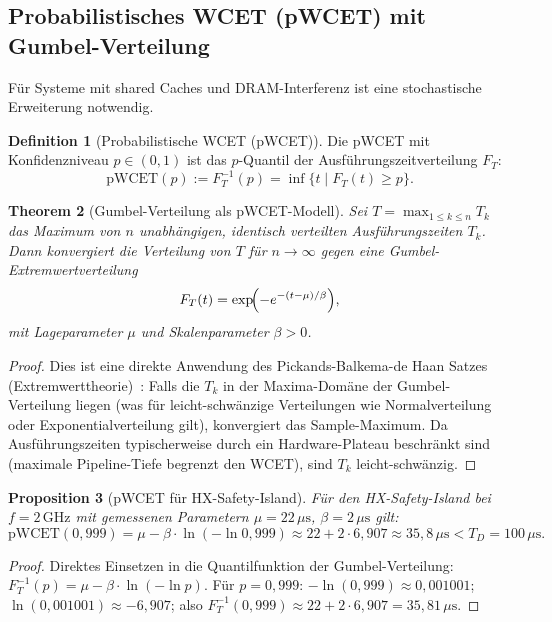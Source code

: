 ﻿\documentclass[a4paper,12pt]{article}
\theoremstyle{plain}
\newtheorem{theorem}{Theorem}[section]
\newtheorem{proposition}[theorem]{Proposition}
\theoremstyle{definition}
\newtheorem{definition}[theorem]{Definition}
\theoremstyle{remark}
\begin{document}
\subsection{Probabilistisches WCET (pWCET) mit Gumbel-Verteilung}
\label{ssec:pwcet}

Für Systeme mit shared Caches und DRAM-Interferenz ist eine
stochastische Erweiterung notwendig.

\begin{definition}[Probabilistische WCET (pWCET)]\label{def:pwcet}
Die pWCET mit Konfidenzniveau $p \in (0,1)$ ist das $p$-Quantil
der Ausführungszeitverteilung $F_T$:
\[
  \mathrm{pWCET}(p) := F_T^{-1}(p) = \inf\{t \mid F_T(t) \geq p\}.
\]
\end{definition}

\begin{theorem}[Gumbel-Verteilung als pWCET-Modell]\label{thm:gumbel}
Sei $T = \max_{1 \leq k \leq n} T_k$ das Maximum von $n$ unabhängigen,
identisch verteilten Ausführungszeiten $T_k$.
Dann konvergiert die Verteilung von $T$ für $n \to \infty$
gegen eine Gumbel-Extremwertverteilung
\[
  F_T(t) = \exp\!\Bigl(-e^{-(t-\mu)/\beta}\Bigr),
\]
mit Lageparameter $\mu$ und Skalenparameter $\beta > 0$.
\end{theorem}
\begin{proof}
Dies ist eine direkte Anwendung des Pickands-Balkema-de Haan Satzes
(Extremwerttheorie)~\cite{coles2001}: Falls die $T_k$ in der
Maxima-Domäne der Gumbel-Verteilung liegen (was für
leicht-schwänzige Verteilungen wie Normalverteilung oder
Exponentialverteilung gilt), konvergiert das Sample-Maximum.
Da Ausführungszeiten typischerweise durch ein Hardware-Plateau
beschränkt sind (maximale Pipeline-Tiefe begrenzt den WCET),
sind $T_k$ leicht-schwänzig.
\end{proof}

\begin{proposition}[pWCET für HX-Safety-Island]\label{prop:pwcet_hx}
Für den HX-Safety-Island bei $f=2\,\mathrm{GHz}$ mit gemessenen
Parametern $\mu = 22\,\mu\text{s}$, $\beta = 2\,\mu\text{s}$ gilt:
\[
  \mathrm{pWCET}(0{,}999) = \mu - \beta \cdot \ln(-\ln 0{,}999)
  \approx 22 + 2 \cdot 6{,}907 \approx 35{,}8\,\mu\text{s}
  < T_D = 100\,\mu\text{s}.
\]
\end{proposition}
\begin{proof}
Direktes Einsetzen in die Quantilfunktion der Gumbel-Verteilung:
$F_T^{-1}(p) = \mu - \beta \cdot \ln(-\ln p)$.
Für $p=0{,}999$: $-\ln(0{,}999) \approx 0{,}001001$;
$\ln(0{,}001001) \approx -6{,}907$; also
$F_T^{-1}(0{,}999) \approx 22 + 2 \cdot 6{,}907 = 35{,}81\,\mu\text{s}$.
\end{proof}
\end{document}
